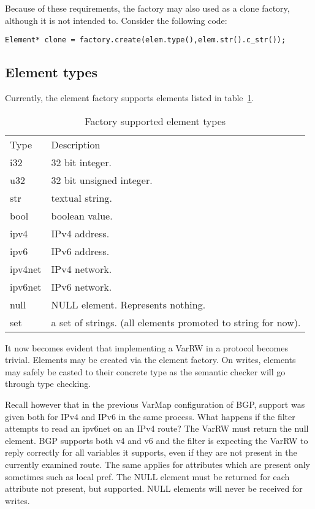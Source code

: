 \documentclass{article}
\begin{document}
Because of these requirements, the factory may also used as a clone factory,
although it is not intended to. Consider the following code:
\begin{verbatim}
Element* clone = factory.create(elem.type(),elem.str().c_str());
\end{verbatim}

\subsection{Element types}
Currently, the element factory supports elements listed in
table~\ref{elemtypes}.
\begin{table}
\begin{tabular}{l l}
Type	& Description \\
i32	& 32 bit integer. \\
u32	& 32 bit unsigned integer. \\
str	& textual string. \\
bool	& boolean value. \\
ipv4	& IPv4 address. \\
ipv6	& IPv6 address. \\
ipv4net	& IPv4 network. \\
ipv6net & IPv6 network. \\
null	& NULL element. Represents nothing. \\
set	& a set of strings. (all elements promoted to string for now). \\
\end{tabular}
\caption{\label{elemtypes}Factory supported element types}
\end{table}

It now becomes evident that implementing a VarRW in a protocol becomes trivial.
Elements may be created via the element factory. On writes, elements may safely
be casted to their concrete type as the semantic checker will go through type
checking.

Recall however that in the previous VarMap configuration of BGP, support was
given both for IPv4 and IPv6 in the same process. What happens if the filter
attempts to read an ipv6net on an IPv4 route? The VarRW must return the null
element. BGP supports both v4 and v6 and the filter is expecting the VarRW to
reply correctly for all variables it supports, even if they are not present in
the currently examined route. The same applies for attributes which are present
only sometimes such as local pref. The NULL element must be returned for each
attribute not present, but supported. NULL elements will never be received for
writes.
\end{document}
